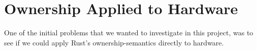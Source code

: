 
\section{Ownership Applied to Hardware}
\label{sec:ownership_allied_to_hardware}

One of the initial problems that we wanted to investigate in this project, was to see if we could apply Rust's ownership-semantics directly to hardware.
